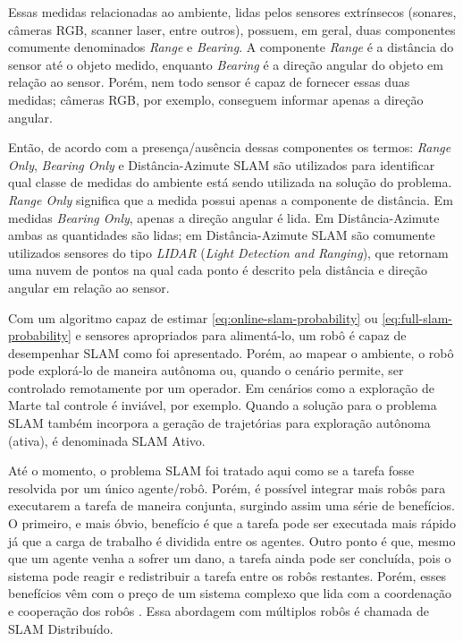 Essas medidas relacionadas ao ambiente, lidas pelos sensores extrínsecos 
(sonares, câmeras RGB, scanner laser, entre outros), possuem, em geral, duas 
componentes comumente denominados \textit{Range} e \textit{Bearing}. 
A componente \textit{Range} é a distância do sensor até o objeto medido, 
enquanto \textit{Bearing} é a direção angular do objeto em relação ao sensor. 
Porém, nem todo sensor é capaz de fornecer essas duas medidas; câmeras RGB, por 
exemplo, conseguem  informar apenas a direção angular.

Então, de acordo com a presença/ausência dessas componentes os termos: 
\textit{Range Only}, \textit{Bearing Only} e Distância-Azimute SLAM são 
utilizados para identificar qual classe de medidas do ambiente está sendo
utilizada na solução do problema. \textit{Range Only} significa que a medida 
possui apenas a 
componente de distância. Em medidas \textit{Bearing Only}, apenas a direção 
angular é lida. Em Distância-Azimute ambas as quantidades são lidas; em 
Distância-Azimute SLAM são comumente utilizados sensores do tipo 
\emph{LIDAR} (\textit{Light Detection and Ranging}), que retornam uma nuvem de 
pontos na qual cada ponto é descrito pela distância e direção angular em relação ao 
sensor.

Com um algoritmo capaz de estimar \ref{eq:online-slam-probability} ou 
\ref{eq:full-slam-probability} e sensores apropriados para alimentá-lo, 
um robô é capaz de desempenhar SLAM como foi apresentado. Porém, ao mapear 
o ambiente, o robô pode explorá-lo de maneira autônoma ou, quando 
o cenário permite, ser controlado remotamente por um operador. Em cenários 
como a exploração de Marte tal controle é inviável, por exemplo. Quando a 
solução para o problema SLAM também incorpora a geração de trajetórias para exploração autônoma (ativa), é denominada SLAM Ativo.

Até o momento, o problema SLAM foi tratado aqui como se a tarefa fosse resolvida 
por um único agente/robô. Porém, é possível integrar mais robôs para executarem 
a tarefa de maneira conjunta, surgindo assim uma série de benefícios. O primeiro, 
e mais óbvio, benefício é que a tarefa pode ser executada mais rápido já que a 
carga de trabalho é dividida entre os agentes. Outro ponto é que, mesmo que um 
agente venha a sofrer um dano, a tarefa ainda pode ser concluída, pois o sistema 
pode reagir e redistribuir a tarefa entre os robôs restantes. Porém, esses 
benefícios vêm com o preço de um sistema complexo que lida com a 
coordenação e cooperação dos robôs \cite{saeedi2016multiple}. Essa abordagem com 
múltiplos robôs é chamada de SLAM Distribuído.


